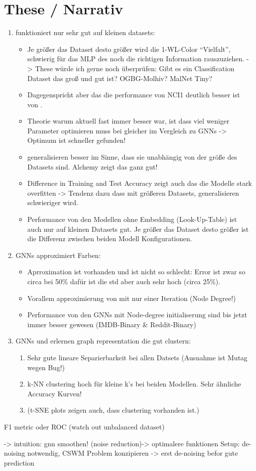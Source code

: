 \chapter{These / Narrativ}
\begin{enumerate}
	\item \wlnn funktioniert nur sehr gut auf kleinen datasets:
	\begin{itemize}
		\item  Je größer das Dataset desto größer wird die 1-WL-Color ``Vielfalt'', schwierig für das MLP des \wlnn noch die richtigen Information rauszuziehen. -> These würde ich gerne noch überprüfen: Gibt es ein Classification Dataset das groß und gut ist? OGBG-Molhiv? MalNet Tiny?
		\item Dagegenspricht aber das die performance von NCI1 deutlich besser ist von \wlnn.
		\item Theorie warum \wlnn aktuell fast immer besser war, ist dass \wlnn viel weniger Parameter optimieren muss bei gleicher im Vergleich zu GNNs -> Optimum ist schneller gefunden!
		\item \gnn generalisieren besser im Sinne, dass sie unabhängig von der größe des Datasets sind. Alchemy zeigt das ganz gut!
		\item Difference in Training and Test Accuracy zeigt auch das die \wlnn Modelle stark overfitten -> Tendenz dazu dass mit größeren Datasets, generalisieren schwieriger wird.
		\item Performance von den \wlnn Modellen ohne Embedding (Look-Up-Table) ist auch nur auf kleinen Datasets gut. Je größer das Dataset desto größer ist die Differenz zwischen beiden Modell Konfigurationen.
	\end{itemize}
	\item GNNs approximiert \wl Farben:
	\begin{itemize}
		\item Aprroximation ist vorhanden und ist nicht so schlecht: Error ist zwar so circa bei 50\% dafür ist die std aber auch sehr hoch (circa 25\%).
		\item Vorallem approximierung von \wl mit nur einer Iteration (Node Degree!)
		\item Performance von den GNNs mit Node-degree initialiserung sind bis jetzt immer besser gewesen (IMDB-Binary \& Reddit-Binary)
	\end{itemize}
	\item GNNs und \wlnn erlernen graph representation die gut clustern:
	\begin{enumerate}
		\item Sehr gute lineare Separierbarkeit bei allen Datsets (Ausnahme ist Mutag wegen Bug!)
		\item k-NN clustering hoch für kleine k's bei beiden Modellen. Sehr ähnliche Accuracy Kurven!
		\item (t-SNE plots zeigen auch, dass clustering vorhanden ist.)
	\end{enumerate}
\end{enumerate}

		
F1  metric oder ROC (watch out unbalanced dataset)

-> intuition: gnn smoothen! (noise reduction)-> \gnn optimalere funktionen
Setup: de-noising notwendig, CSWM Problem konzipieren -> erst de-noising befor gute prediction
